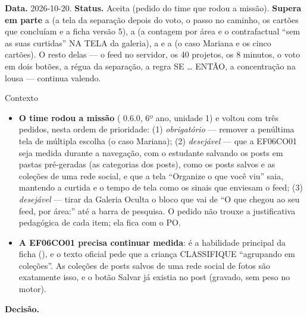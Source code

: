 \textbf{Data.} 2026-10-20. \textbf{Status.} Aceita (pedido do time que rodou a
missão). \textbf{Supera em parte} a  (a tela da separação depois
do voto, o passo  no caminho, os cartões que concluíam e a
ficha versão 5), a  (a contagem por área e o contrafactual
\enquote{sem as suas curtidas} NA TELA da galeria), a  e a
 (o caso Mariana e os cinco cartões). O resto delas --- o feed no
servidor, os 40 projetos, os 8 minutos, o voto em dois botões, a régua da
separação, a regra SE \ldots{} ENTÃO, a concentração na lousa --- continua
valendo.

\begin{especificacao}{Contexto}
\begin{itemize}
  \item \textbf{O time rodou a missão} ( 0.6.0, 6º ano, unidade
    1) e voltou com três pedidos, nesta ordem de prioridade: (1)
    \emph{obrigatório} --- remover a penúltima tela de múltipla escolha (o caso
    Mariana); (2) \emph{desejável} --- que a EF06CO01 seja medida durante a
    navegação, com o estudante salvando os posts em pastas pré-geradas (as
    categorias dos posts), como os posts salvos e as coleções de uma rede
    social, e que a tela \enquote{Organize o que você viu} saia, mantendo a
    curtida e o tempo de tela como os sinais que enviesam o feed; (3)
    \emph{desejável} --- tirar da Galeria Oculta o bloco que vai de
    \enquote{O que chegou ao seu feed, por área:} até a barra de pesquisa. O
    pedido não trouxe a justificativa pedagógica de cada item; ela fica com o
    PO.
  \item \textbf{A EF06CO01 precisa continuar medida}: é a habilidade principal
    da ficha (), e o texto oficial pede que a criança CLASSIFIQUE
    \enquote{agrupando em coleções}. As coleções de posts salvos de uma rede
    social de fotos são exatamente isso, e o botão Salvar já existia no post
    (gravado, sem peso no motor).
\end{itemize}
\end{especificacao}

\textbf{Decisão.}

